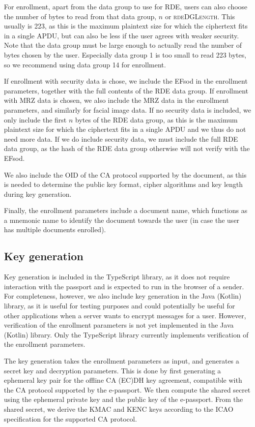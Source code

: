 For enrollment, apart from the data group to use for RDE, users can also choose the number of bytes to read from that data group, $n$ or \textsc{rdeDGLength}.
This usually is 223, as this is the maximum plaintext size for which the ciphertext fits in a single APDU, but can also be less if the user agrees with weaker security.
Note that the data group must be large enough to actually read the number of bytes chosen by the user.
Especially data group 1 is too small to read 223 bytes, so we recommend using data group 14 for enrollment.

If enrollment with security data is chose, we include the EFsod in the enrollment parameters, together with the full contents of the RDE data group.
If enrollment with MRZ data is chosen, we also include the MRZ data in the enrollment parameters, and similarly for facial image data.
If no security data is included, we only include the first $n$ bytes of the RDE data group, as this is the maximum plaintext size for which the ciphertext fits in a single APDU and we thus do not need more data.
If we do include security data, we must include the full RDE data group, as the hash of the RDE data group otherwise will not verify with the EFsod.

We also include the OID of the CA protocol supported by the document, as this is needed to determine the public key format, cipher algorithms and key length during key generation.

Finally, the enrollment parameters include a document name, which functions as a mnemonic name to identify the document towards the user (in case the user has multiple documents enrolled).

\subsection{Key generation}\label{subsec:key-generation}
Key generation is included in the TypeScript library, as it does not require interaction with the passport and is expected to run in the browser of a sender.
For completeness, however, we also include key generation in the Java (Kotlin) library, as it is useful for testing purposes and could potentially be useful for other applications when a server wants to encrypt messages for a user.
However, verification of the enrollment parameters is not yet implemented in the Java (Kotlin) library.
Only the TypeScript library currently implements verification of the enrollment parameters.

The key generation takes the enrollment parameters as input, and generates a secret key and decryption parameters.
This is done by first generating a ephemeral key pair for the offline CA (EC)DH key agreement, compatible with the CA protocol supported by the e-passport.
We then compute the shared secret using the ephemeral private key and the public key of the e-passport.
From the shared secret, we derive the KMAC and KENC keys according to the ICAO specification for the supported CA protocol.

